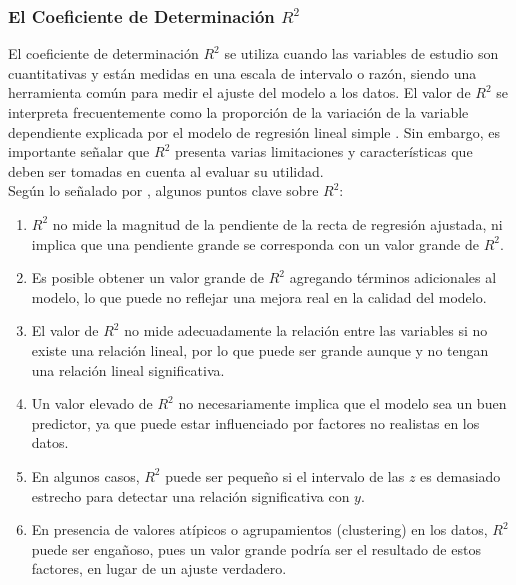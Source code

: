 \subsubsection{El Coeficiente de Determinación $R^{2}$}

El coeficiente de determinación $R^{2}$ se utiliza cuando las variables de estudio son cuantitativas y están medidas en una escala de intervalo o razón, siendo una herramienta común para medir el ajuste del modelo a los datos. El valor de $R^{2}$
se interpreta frecuentemente como la proporción de la variación de la variable dependiente explicada por el modelo de regresión lineal simple \parencite{balam-2012}. Sin embargo, es importante señalar que $R^{2}$
presenta varias limitaciones y características que deben ser tomadas en cuenta al evaluar su utilidad.\\


Según lo señalado por \textcite{balam-2012}, algunos puntos clave sobre $R^{2}$:\\

\begin{enumerate} 
	\item $R^{2}$ no mide la magnitud de la pendiente de la recta de regresión ajustada, ni implica que una pendiente grande se corresponda con un valor grande de $R^{2}$. 
	
	\item Es posible obtener un valor grande de $R^{2}$ agregando términos adicionales al modelo, lo que puede no reflejar una mejora real en la calidad del modelo.
	
	\item El valor de $R^{2}$  no mide adecuadamente la relación entre las variables si no existe una relación lineal, por lo que puede ser grande aunque 
	y no tengan una relación lineal significativa. 
	
	\item Un valor elevado de $R^{2}$ no necesariamente implica que el modelo sea un buen predictor, ya que puede estar influenciado por factores no realistas en los datos.
	
	\item En algunos casos, $R^{2}$ puede ser pequeño si el intervalo de las $z$  es demasiado estrecho para detectar una relación significativa con $y$. 
	
	\item En presencia de valores atípicos o agrupamientos (clustering) en los datos, $R^{2}$ puede ser engañoso, pues un valor grande podría ser el resultado de estos factores, en lugar de un ajuste verdadero. \\
\end{enumerate}


